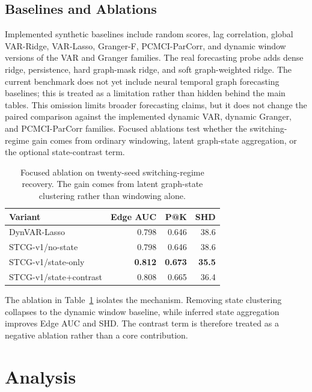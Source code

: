 \documentclass[sigconf,review,anonymous]{acmart}
\begin{document}
\subsection{Baselines and Ablations}

Implemented synthetic baselines include random scores, lag correlation, global VAR-Ridge, VAR-Lasso, Granger-F, PCMCI-ParCorr, and dynamic window versions of the VAR and Granger families.
The real forecasting probe adds dense ridge, persistence, hard graph-mask ridge, and soft graph-weighted ridge.
The current benchmark does not yet include neural temporal graph forecasting baselines; this is treated as a limitation rather than hidden behind the main tables.
This omission limits broader forecasting claims, but it does not change the paired comparison against the implemented dynamic VAR, dynamic Granger, and PCMCI-ParCorr families.
Focused ablations test whether the switching-regime gain comes from ordinary windowing, latent graph-state aggregation, or the optional state-contrast term.

\begin{table}[t]
\caption{Focused ablation on twenty-seed switching-regime recovery. The gain comes from latent graph-state clustering rather than windowing alone.}
\label{tab:state-ablation}
\centering
\small
\begin{tabular}{lrrr}
\toprule
Variant & Edge AUC & P@K & SHD \\
\midrule
DynVAR-Lasso & 0.798 & 0.646 & 38.6 \\
STCG-v1/no-state & 0.798 & 0.646 & 38.6 \\
STCG-v1/state-only & \textbf{0.812} & \textbf{0.673} & \textbf{35.5} \\
STCG-v1/state+contrast & 0.808 & 0.665 & 36.4 \\
\bottomrule
\end{tabular}
\end{table}

The ablation in Table~\ref{tab:state-ablation} isolates the mechanism.
Removing state clustering collapses to the dynamic window baseline, while inferred state aggregation improves Edge AUC and SHD.
The contrast term is therefore treated as a negative ablation rather than a core contribution.

\section{Analysis}
\end{document}
